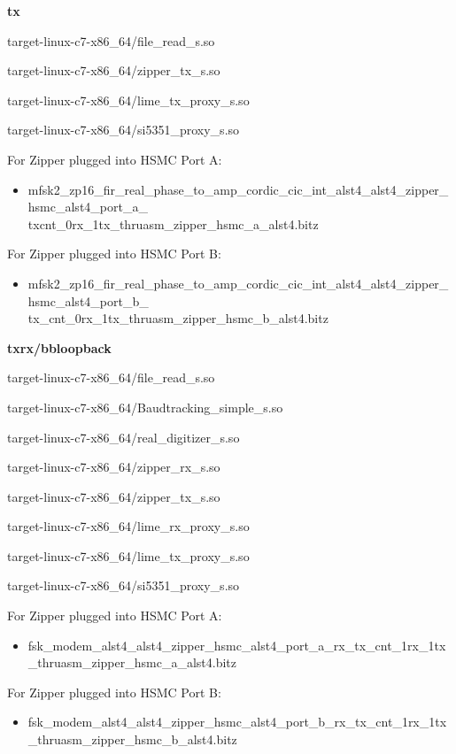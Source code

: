 	\noindent\textbf{tx}
	\begin{itemize}
	\begin{minipage}[t]{.5\textwidth}
	\item target-linux-c7-x86\_64/file\_read\_s.so
	\item target-linux-c7-x86\_64/zipper\_tx\_s.so
	\end{minipage}
	\begin{minipage}[t]{.5\textwidth}
	\item target-linux-c7-x86\_64/lime\_tx\_proxy\_s.so
	\item target-linux-c7-x86\_64/si5351\_proxy\_s.so
	\end{minipage}
	\end{itemize}
	For Zipper plugged into HSMC Port A:
	\begin{itemize}
	\item mfsk2\_zp16\_fir\_real\_phase\_to\_amp\_cordic\_cic\_int\_alst4\_alst4\_zipper\_hsmc\_alst4\_port\_a\_\\
		txcnt\_0rx\_1tx\_thruasm\_zipper\_hsmc\_a\_alst4.bitz
	\end{itemize}
	For Zipper plugged into HSMC Port B:
	\begin{itemize}
	\item mfsk2\_zp16\_fir\_real\_phase\_to\_amp\_cordic\_cic\_int\_alst4\_alst4\_zipper\_hsmc\_alst4\_port\_b\_\\
		tx\_cnt\_0rx\_1tx\_thruasm\_zipper\_hsmc\_b\_alst4.bitz 
	\end{itemize}

	\noindent\textbf{txrx/bbloopback}
	\begin{itemize}
	\begin{minipage}[t]{.5\textwidth}
	\item target-linux-c7-x86\_64/file\_read\_s.so
	\item target-linux-c7-x86\_64/Baudtracking\_simple\_s.so
	\item target-linux-c7-x86\_64/real\_digitizer\_s.so
	\item target-linux-c7-x86\_64/zipper\_rx\_s.so
	\end{minipage}
	\begin{minipage}[t]{.5\textwidth}
	\item target-linux-c7-x86\_64/zipper\_tx\_s.so
	\item target-linux-c7-x86\_64/lime\_rx\_proxy\_s.so
	\item target-linux-c7-x86\_64/lime\_tx\_proxy\_s.so
	\item target-linux-c7-x86\_64/si5351\_proxy\_s.so
	\end{minipage}
	\end{itemize}
	For Zipper plugged into HSMC Port A:
	\begin{itemize}
		\item fsk\_modem\_alst4\_alst4\_zipper\_hsmc\_alst4\_port\_a\_rx\_tx\_cnt\_1rx\_1tx\_thruasm\_zipper\_hsmc\_a\_alst4.bitz 
	\end{itemize}
	\noindent For Zipper plugged into HSMC Port B:
	\begin{itemize}
		\item fsk\_modem\_alst4\_alst4\_zipper\_hsmc\_alst4\_port\_b\_rx\_tx\_cnt\_1rx\_1tx\_thruasm\_zipper\_hsmc\_b\_alst4.bitz
	\end{itemize}
